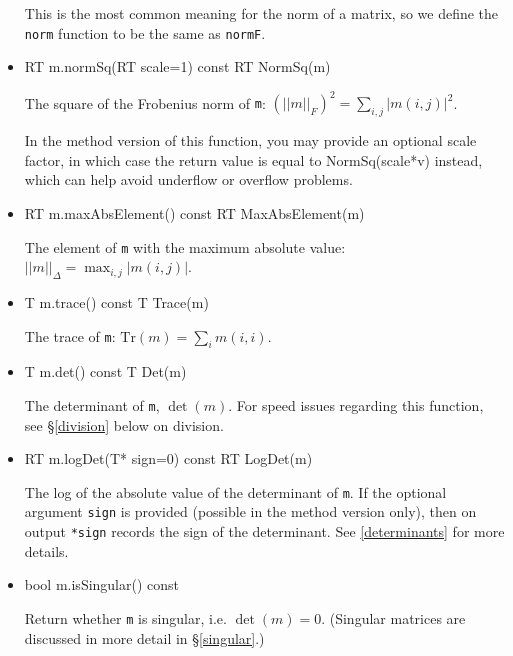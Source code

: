 \documentclass[twoside,letterpaper,11pt]{article}
\renewcommand{\tt}[1]{{\lstinline {#1}}}
\begin{document}
\begin{itemize}
This is the most common meaning for the norm of a matrix, so we
define the \tt{norm} function to be the same as \tt{normF}.

\item
\begin{tmvcode}
RT m.normSq(RT scale=1) const
RT NormSq(m)
\end{tmvcode}
The square of the Frobenius norm of \tt{m}: 
$(||m||_F)^2 = \sum_{i,j} |m(i,j)|^2$.

In the method version of this function, you may provide an optional scale factor,
in which case the return value is equal to NormSq(scale*v) instead, 
which can help avoid underflow or overflow problems.

\item
\begin{tmvcode}
RT m.maxAbsElement() const
RT MaxAbsElement(m)
\end{tmvcode}
The element of \tt{m} with the maximum absolute value: 
$||m||_\Delta = \max_{i,j} |m(i,j)|$.

\item
\begin{tmvcode}
T m.trace() const
T Trace(m)
\end{tmvcode}
The trace of \tt{m}: $\mathrm{Tr}(m) = \sum_i m(i,i)$.

\item
\begin{tmvcode}
T m.det() const
T Det(m)
\end{tmvcode}
The determinant of \tt{m}, $\det(m)$.  For speed issues regarding this function, see 
\S\ref{division} below on division.

\item
\begin{tmvcode}
RT m.logDet(T* sign=0) const
RT LogDet(m)
\end{tmvcode}
The log of the absolute value of the determinant of \tt{m}.  If the optional argument \tt{sign} is 
provided (possible in the method version only), then on output \tt{*sign} records the sign of the determinant.  See \ref{determinants} 
for more details.

\item
\begin{tmvcode}
bool m.isSingular() const
\end{tmvcode}
Return whether \tt{m} is singular, i.e. $\det(m) = 0$.
(Singular matrices are discussed in more detail in \S\ref{singular}.)


\end{itemize}
\end{document}
